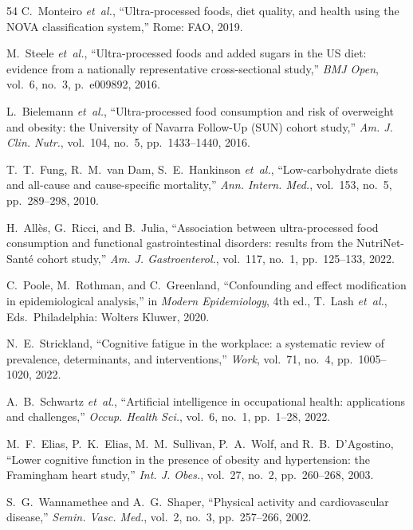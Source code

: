 \documentclass[journal,twoside,10pt]{IEEEtran}
\begin{document}
\begin{thebibliography}{54}
 C.~Monteiro \textit{et~al.}, ``Ultra-processed foods, diet quality, and health using the NOVA classification system,'' Rome: FAO, 2019.

 M.~Steele \textit{et~al.}, ``Ultra-processed foods and added sugars in the US diet: evidence from a nationally representative cross-sectional study,'' \textit{BMJ Open}, vol.~6, no.~3, p.~e009892, 2016.

 L.~Bielemann \textit{et~al.}, ``Ultra-processed food consumption and risk of overweight and obesity: the University of Navarra Follow-Up (SUN) cohort study,'' \textit{Am. J. Clin. Nutr.}, vol.~104, no.~5, pp.~1433--1440, 2016.

 T.~T.~Fung, R.~M.~van Dam, S.~E.~Hankinson \textit{et~al.}, ``Low-carbohydrate diets and all-cause and cause-specific mortality,'' \textit{Ann. Intern. Med.}, vol.~153, no.~5, pp.~289--298, 2010.

 H.~All\`{e}s, G.~Ricci, and B.~Julia, ``Association between ultra-processed food consumption and functional gastrointestinal disorders: results from the NutriNet-Sant\'{e} cohort study,'' \textit{Am. J. Gastroenterol.}, vol.~117, no.~1, pp.~125--133, 2022.

 C.~Poole, M.~Rothman, and C.~Greenland, ``Confounding and effect modification in epidemiological analysis,'' in \textit{Modern Epidemiology}, 4th ed., T.~Lash \textit{et~al.}, Eds.~Philadelphia: Wolters Kluwer, 2020.

 N.~E.~Strickland, ``Cognitive fatigue in the workplace: a systematic review of prevalence, determinants, and interventions,'' \textit{Work}, vol.~71, no.~4, pp.~1005--1020, 2022.

 A.~B.~Schwartz \textit{et~al.}, ``Artificial intelligence in occupational health: applications and challenges,'' \textit{Occup. Health Sci.}, vol.~6, no.~1, pp.~1--28, 2022.

 M.~F.~Elias, P.~K.~Elias, M.~M.~Sullivan, P.~A.~Wolf, and R.~B.~D'Agostino, ``Lower cognitive function in the presence of obesity and hypertension: the Framingham heart study,'' \textit{Int. J. Obes.}, vol.~27, no.~2, pp.~260--268, 2003.

 S.~G.~Wannamethee and A.~G.~Shaper, ``Physical activity and cardiovascular disease,'' \textit{Semin. Vasc. Med.}, vol.~2, no.~3, pp.~257--266, 2002.

\end{thebibliography}
\end{document}
